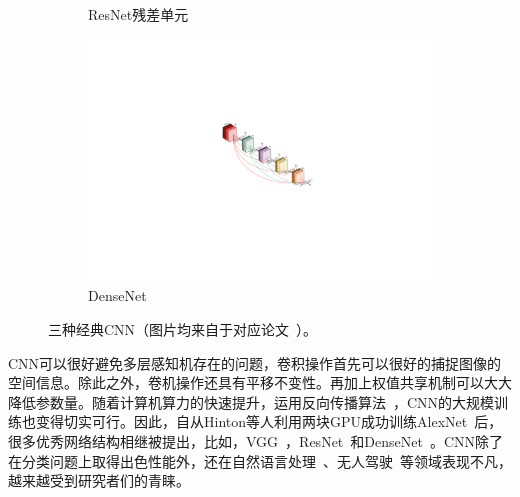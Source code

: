 \begin{figure}[h!]
\begin{subfigure}{0.336\textwidth}
		\caption{ResNet残差单元~\cite{he2016deep}}
		\label{subfig:resnet_block}
	\end{subfigure}
	\begin{subfigure}{0.265\textwidth}
		\centering
		\includegraphics[width=1.0\textwidth]{figure/popular_networks_densenet}
		\caption{DenseNet~\cite{huang2017densely}}
	\end{subfigure}
	\caption[三种经典CNN]{三种经典CNN（图片均来自于对应论文~\cite{krizhevsky2012imagenet, he2016deep, huang2017densely}）。} 
	\label{mulfig:popular_networks}
\end{figure}


CNN可以很好避免多层感知机存在的问题，卷积操作首先可以很好的捕捉图像的空间信息。除此之外，卷机操作还具有平移不变性。再加上权值共享机制可以大大降低参数量。随着计算机算力的快速提升，运用反向传播算法~\cite{hecht1992theory}，CNN的大规模训练也变得切实可行。因此，自从Hinton等人利用两块GPU成功训练AlexNet~\cite{krizhevsky2012imagenet}后，很多优秀网络结构相继被提出，比如，VGG~\cite{simonyan2014very}，ResNet~\cite{he2016deep, he2016identity}和DenseNet~\cite{huang2017densely}。CNN除了在分类问题上取得出色性能外，还在自然语言处理~\cite{dos2014deep, mou2016Convolutional}、无人驾驶~\cite{lee2017deep}等领域表现不凡，越来越受到研究者们的青睐。

